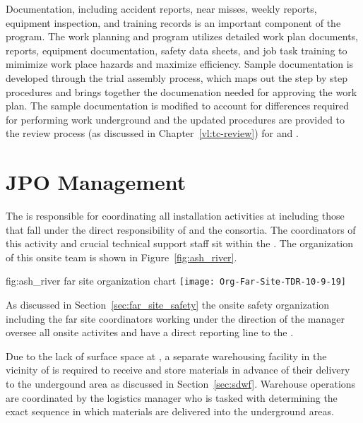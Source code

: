 Documentation, including accident reports, near misses, weekly
reports, equipment inspection, and training records is an important
component of the   program. The work
planning and  program utilizes detailed work plan documents,
 reports, equipment documentation, safety data sheets,
 and job task training to mimimize work place hazards and
maximize efficiency.  Sample documentation is developed through the
 trial assembly process, which maps out the step by
step procedures and brings together the documenation needed for
approving the work plan.  The sample documentation is modified to
account for differences required for performing work underground and
the updated procedures are provided to the review process (as
discussed in Chapter~\ref{vl:tc-review}) for  and
.

\section{JPO Management}
\label{vl:tc-facility_mgmt}

The  is responsible for coordinating all installation
activities at  including those that fall under the direct
responsibility of  and the  consortia.  The
coordinators of this activity and crucial technical support
staff sit within the .  The organization of this onsite
team is shown in Figure~\ref{fig:ash_river}.
\begin{dunefigure}{fig:ash_river}
  {far site organization chart}
  \texttt{[image: Org-Far-Site-TDR-10-9-19]}
\end{dunefigure}
 
As discussed in Section~\ref{sec:far_site_safety} the onsite safety
organization including the far site  coordinators
working under the direction of the  
manager oversee all onsite activites and have a direct reporting line
to the .

Due to the lack of surface space at , a separate
warehousing facility in the vicinity of  is required to
receive and store materials in advance of their delivery to the
undergound area as discussed in Section~\ref{sec:sdwf}.  Warehouse
operations are coordinated by the  logistics manager
who is tasked with determining the exact sequence in which materials
are delivered into the underground areas.

